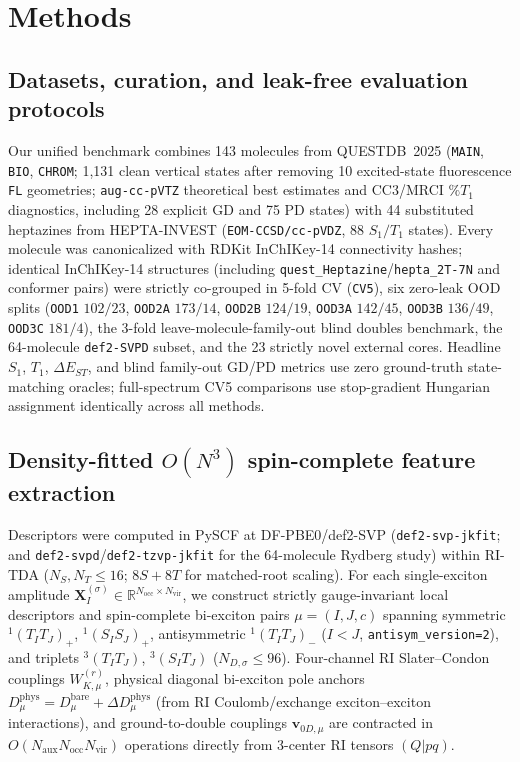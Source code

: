 \documentclass[10pt,twocolumn]{article}
\theoremstyle{natthm}
\newcommand{\dEST}{\Delta E_{ST}}
\newcommand{\pctT}{\mathrm{\%}T_1}
\begin{document}
\section*{Methods}
\subsection*{Datasets, curation, and leak-free evaluation protocols}
Our unified benchmark combines 143 molecules from QUESTDB~2025\cite{loos2025quest,kossoski2024doubles} (\texttt{MAIN}, \texttt{BIO}, \texttt{CHROM}; 1,131 clean vertical states after removing 10 excited-state fluorescence \texttt{FL} geometries; \texttt{aug-cc-pVTZ} theoretical best estimates and CC3/MRCI $\pctT$ diagnostics, including 28 explicit GD and 75 PD states) with 44 substituted heptazines from HEPTA-INVEST\cite{rishi2025} (\texttt{EOM-CCSD/cc-pVDZ}, 88 $S_1/T_1$ states).
Every molecule was canonicalized with RDKit InChIKey-14 connectivity hashes; identical InChIKey-14 structures (including \texttt{quest\_Heptazine}/\texttt{hepta\_2T-7N} and conformer pairs) were strictly co-grouped in 5-fold CV (\texttt{CV5}), six zero-leak OOD splits (\texttt{OOD1} $102/23$, \texttt{OOD2A} $173/14$, \texttt{OOD2B} $124/19$, \texttt{OOD3A} $142/45$, \texttt{OOD3B} $136/49$, \texttt{OOD3C} $181/4$), the 3-fold leave-molecule-family-out blind doubles benchmark, the 64-molecule \texttt{def2-SVPD} subset, and the 23 strictly novel external cores.
Headline $S_1$, $T_1$, $\dEST$, and blind family-out GD/PD metrics use zero ground-truth state-matching oracles; full-spectrum CV5 comparisons use stop-gradient Hungarian assignment\cite{kuhn1955hungarian} identically across all methods.

\subsection*{Density-fitted $O(N^3)$ spin-complete feature extraction}
Descriptors were computed in PySCF\cite{sun2020pyscf} at DF-PBE0\cite{adamo1999pbe0}/def2-SVP\cite{weigend2005def2} (\texttt{def2-svp-jkfit}\cite{weigend2008jkfit}; and \texttt{def2-svpd}/\texttt{def2-tzvp-jkfit} for the 64-molecule Rydberg study) within RI-TDA ($N_S,N_T\le 16$; $8S+8T$ for matched-root scaling).
For each single-exciton amplitude $\mathbf{X}_I^{(\sigma)}\in\mathbb{R}^{N_{\mathrm{occ}}\times N_{\mathrm{vir}}}$, we construct strictly gauge-invariant local descriptors and spin-complete bi-exciton pairs $\mu=(I,J,c)$ spanning symmetric $^1(T_I T_J)_+$, $^1(S_I S_J)_+$, antisymmetric $^1(T_I T_J)_-$ ($I<J$, \texttt{antisym\_version=2}), and triplets $^3(T_I T_J)$, $^3(S_I T_J)$ ($N_{D,\sigma}\le 96$).
Four-channel RI Slater--Condon couplings $W_{K,\mu}^{(r)}$, physical diagonal bi-exciton pole anchors $D_\mu^{\mathrm{phys}}=D_\mu^{\mathrm{bare}}+\Delta D_\mu^{\mathrm{phys}}$ (from RI Coulomb/exchange exciton--exciton interactions), and ground-to-double couplings $\mathbf{v}_{0D,\mu}$ are contracted in $O(N_{\mathrm{aux}}N_{\mathrm{occ}}N_{\mathrm{vir}})$ operations directly from 3-center RI tensors $(Q|pq)$.
\end{document}
